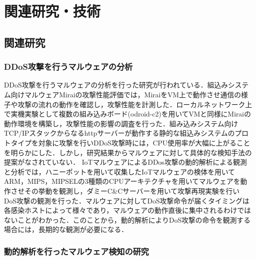 \chapter{関連研究・技術}
 
\section{関連研究}

\subsection{DDoS攻撃を行うマルウェアの分析}
DDoS攻撃を行うマルウェアの分析を行った研究が行われている．組込みシステム向けマルウェアMiraiの攻撃性能評価\cite{攻撃性能評価を行った研究}では，MiraiをVM上で動作させ通信の様子や攻撃の流れの動作を確認し，攻撃性能を計測した．ローカルネットワーク上で実機実験として複数の組み込みボード(odroid-c2)を用いてVMと同様にMiraiの動作環境を構築し，攻撃性能の影響の調査を行った．組み込みシステム向けTCP/IPスタックからなるhttpサーバーが動作する静的な組込みシステムのプロトタイプを対象に攻撃を行いDDoS攻撃時には，CPU使用率が大幅に上がることを明らかにした．しかし，研究結果からマルウェアに対して具体的な検知手法の提案がなされていない．
IoTマルウェアによるDDos攻撃の動的解析による観測と分析\cite{観測と分析}では，ハニーポットを用いて収集したIoTマルウェアの検体を用いてARM，MIPS，MIPSELの3種類のCPUアーキテクチャを用いてマルウェアを動作させその挙動を観測し，ダミーC\&Cサーバーを用いて攻撃再現実験を行いDoS攻撃の観測を行った．マルウェアに対してDoS攻撃命令が届くタイミングは各感染ホストによって様々であり，マルウェアの動作直後に集中されるわけではないことがわかった．このことから，動的解析によりDoS攻撃の命令を観測する場合には，長期的な観測が必要になる．

\subsection{動的解析を行ったマルウェア検知の研究} %

